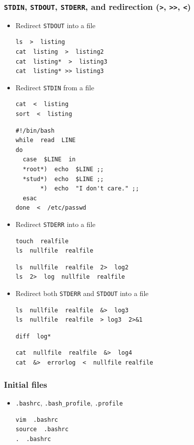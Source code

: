 \documentclass[12pt]{article}
\begin{document}
\subsubsection{\texttt{STDIN}, \texttt{STDOUT}, \texttt{STDERR}, and redirection (\texttt{>}, \texttt{>>}, \texttt{<})}
\label{sec-2-10-7}
\begin{itemize}
\item Redirect \texttt{STDOUT} into a file
\begin{verbatim}
ls  >  listing
cat  listing  >  listing2
cat  listing*  >  listing3
cat  listing* >> listing3
\end{verbatim}
\item Redirect \texttt{STDIN} from a file
\begin{verbatim}
cat  <  listing
sort  <  listing
\end{verbatim}
\begin{verbatim}
#!/bin/bash
while  read  LINE
do
  case  $LINE  in  
  *root*)  echo  $LINE ;;
  *stud*)  echo  $LINE ;;
       *)  echo  "I don't care." ;;
  esac 
done  <  /etc/passwd
\end{verbatim}
\item Redirect \texttt{STDERR} into a file
\begin{verbatim}
touch  realfile
ls  nullfile  realfile
\end{verbatim}

\begin{verbatim}
ls  nullfile  realfile  2>  log2
ls  2>  log  nullfile  realfile
\end{verbatim}
\item Redirect both \texttt{STDERR} and \texttt{STDOUT} into a file
\begin{verbatim}
ls  nullfile  realfile  &>  log3
ls  nullfile  realfile  > log3  2>&1
\end{verbatim}

\begin{verbatim}
diff  log*
\end{verbatim}

\begin{verbatim}
cat  nullfile  realfile  &>  log4
cat  &>  errorlog  <  nullfile realfile
\end{verbatim}
\end{itemize}

\subsubsection{Initial files}
\label{sec-2-10-8}
\begin{itemize}
\item \texttt{.bashrc}, \texttt{.bash\_profile}, \texttt{.profile}
\begin{verbatim}
vim  .bashrc
source  .bashrc
.  .bashrc
\end{verbatim}
\end{itemize}
\end{document}
